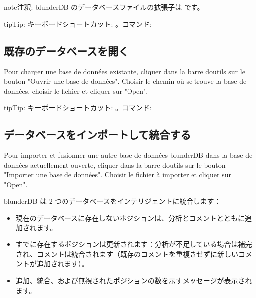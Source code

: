 \documentclass[letterpaper,10pt,dvipdfmx]{sphinxmanual}
\begin{document}
\begin{sphinxadmonition}{note}{注釈:}
\sphinxAtStartPar
blunderDB のデータベースファイルの拡張子は  です。
\end{sphinxadmonition}

\begin{sphinxadmonition}{tip}{Tip:}
\sphinxAtStartPar
キーボードショートカット: 。コマンド: 
\end{sphinxadmonition}


\subsection{既存のデータベースを開く}
\label{\detokenize{guide_utilisateur:ouvrir-une-base-de-donnee-existante}}
\sphinxAtStartPar
Pour charger une base de données existante, cliquer dans la barre d\textquotesingle{}outils sur
le bouton "Ouvrir une base de données". Choisir le chemin où se trouve la base
de données, choisir le fichier  et cliquer sur "Open".

\begin{sphinxadmonition}{tip}{Tip:}
\sphinxAtStartPar
キーボードショートカット: 。コマンド: 
\end{sphinxadmonition}


\subsection{データベースをインポートして統合する}
\label{\detokenize{guide_utilisateur:importer-et-fusionner-une-base-de-donnees}}
\sphinxAtStartPar
Pour importer et fusionner une autre base de données blunderDB dans la base de
données actuellement ouverte, cliquer dans la barre d\textquotesingle{}outils sur le bouton
"Importer une base de données". Choisir le fichier  à importer et
cliquer sur "Open".

\sphinxAtStartPar
blunderDB は 2 つのデータベースをインテリジェントに統合します：
\begin{itemize}
\item {} 
\sphinxAtStartPar
現在のデータベースに存在しないポジションは、分析とコメントとともに追加されます。

\item {} 
\sphinxAtStartPar
すでに存在するポジションは更新されます：分析が不足している場合は補完され、コメントは統合されます（既存のコメントを重複させずに新しいコメントが追加されます）。

\item {} 
\sphinxAtStartPar
追加、統合、および無視されたポジションの数を示すメッセージが表示されます。

\end{itemize}
\end{document}
